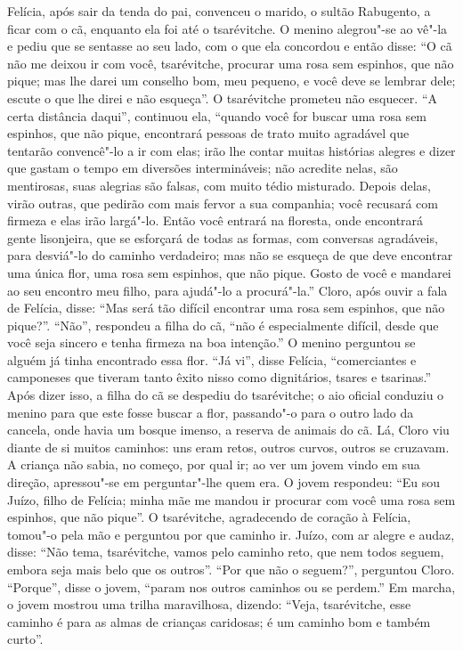Felícia, após sair da tenda do pai, convenceu o marido, o sultão
Rabugento, a ficar com o cã, enquanto ela foi até o tsarévitche. O
menino alegrou"-se ao vê"-la e pediu que se sentasse ao seu lado, com o
que ela concordou e então disse: ``O cã não me deixou ir com você,
tsarévitche, procurar uma rosa sem espinhos, que não pique; mas lhe
darei um conselho bom, meu pequeno, e você deve se lembrar dele; escute
o que lhe direi e não esqueça''. O tsarévitche prometeu não esquecer.
``A certa distância daqui'', continuou ela, ``quando você for buscar uma
rosa sem espinhos, que não pique, encontrará pessoas de trato muito
agradável que tentarão convencê"-lo a ir com elas; irão lhe contar muitas
histórias alegres e dizer que gastam o tempo em diversões intermináveis;
não acredite nelas, são mentirosas, suas alegrias são falsas, com muito
tédio misturado. Depois delas, virão outras, que pedirão com mais fervor
a sua companhia; você recusará com firmeza e elas irão largá"-lo. Então
você entrará na floresta, onde encontrará gente lisonjeira, que se
esforçará de todas as formas, com conversas agradáveis, para desviá"-lo
do caminho verdadeiro; mas não se esqueça de que deve encontrar uma
única flor, uma rosa sem espinhos, que não pique. Gosto de você e
mandarei ao seu encontro meu filho, para ajudá"-lo a procurá"-la.'' Cloro,
após ouvir a fala de Felícia, disse: ``Mas será tão difícil encontrar
uma rosa sem espinhos, que não pique?''. ``Não'', respondeu a filha do
cã, ``não é especialmente difícil, desde que você seja sincero e tenha
firmeza na boa intenção.'' O menino perguntou se alguém já tinha
encontrado essa flor. ``Já vi'', disse Felícia, ``comerciantes e
camponeses que tiveram tanto êxito nisso como dignitários, tsares e
tsarinas.'' Após dizer isso, a filha do cã se despediu do tsarévitche; o
aio oficial conduziu o menino para que este fosse buscar a flor, passando"-o para o outro lado da cancela, onde
havia um bosque imenso, a reserva de animais do cã. Lá, Cloro viu diante
de si muitos caminhos: uns eram retos, outros curvos, outros se
cruzavam. A criança não sabia, no começo, por qual ir; ao ver um jovem
vindo em sua direção, apressou"-se em perguntar"-lhe quem era. O jovem
respondeu: ``Eu sou Juízo, filho de Felícia; minha mãe me mandou ir
procurar com você uma rosa sem espinhos, que não pique''. O tsarévitche,
agradecendo de coração à Felícia, tomou"-o pela mão e perguntou por que
caminho ir. Juízo, com ar alegre e audaz, disse: ``Não tema,
tsarévitche, vamos pelo caminho reto, que nem todos seguem, embora seja
mais belo que os outros''. ``Por que não o seguem?'', perguntou Cloro.
``Porque'', disse o jovem, ``param nos outros caminhos ou se perdem.''
Em marcha, o jovem mostrou uma trilha maravilhosa, dizendo: ``Veja,
tsarévitche, esse caminho é para as almas de crianças caridosas; é um
caminho bom e também curto''.

